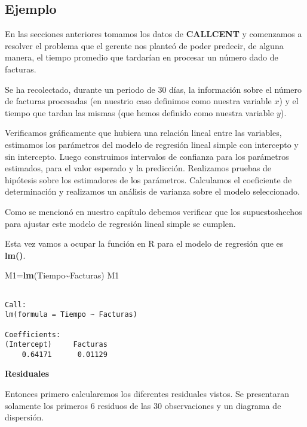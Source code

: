 \documentclass[
  a4paper,
  oneside,
  openany]{book}
\newenvironment{Shaded}{\begin{snugshade}}{\end{snugshade}}
\newcommand{\FunctionTok}[1]{\textcolor[rgb]{0.13,0.29,0.53}{\textbf{#1}}}
\newcommand{\NormalTok}[1]{#1}
\newcommand{\OtherTok}[1]{\textcolor[rgb]{0.56,0.35,0.01}{#1}}
\newcommand{\SpecialCharTok}[1]{\textcolor[rgb]{0.81,0.36,0.00}{\textbf{#1}}}
\begin{document}
\hypertarget{ejemplo-19}{%
\subsection{Ejemplo}\label{ejemplo-19}}

En las secciones anteriores tomamos los datos de \textbf{CALLCENT} y comenzamos a resolver el problema que el gerente nos planteó de poder
predecir, de alguna manera, el tiempo promedio que tardarían en procesar un número dado de facturas.

Se ha recolectado, durante un periodo de 30 días, la información sobre el número de facturas procesadas (en nuestrio caso definimos como nuestra variable \(x\)) y el tiempo que tardan las mismas (que hemos definido como nuestra variable \(y\)).

Verificamos gráficamente que hubiera una relación lineal entre las variables, estimamos los parámetros del modelo de regresión lineal simple con intercepto y sin intercepto. Luego construimos intervalos de confianza para los parámetros estimados, para el valor esperado y la predicción. Realizamos pruebas de hipótesis sobre los estimadores de los parámetros. Calculamos el coeficiente de determinación y realizamos un análisis de varianza sobre el modelo seleccionado.

Como se mencionó en nuestro capítulo debemos verificar que los supuestoshechos para ajustar este modelo de regresión lineal simple se cumplen.

Esta vez vamos a ocupar la función en R para el modelo de regresión que es \textbf{lm()}.

\begin{Shaded}
\begin{Highlighting}[]
\NormalTok{M1}\OtherTok{=}\FunctionTok{lm}\NormalTok{(Tiempo}\SpecialCharTok{\textasciitilde{}}\NormalTok{Facturas)}
\NormalTok{M1}
\end{Highlighting}
\end{Shaded}

\begin{verbatim}

Call:
lm(formula = Tiempo ~ Facturas)

Coefficients:
(Intercept)     Facturas  
    0.64171      0.01129  
\end{verbatim}

\textbf{Residuales}

Entonces primero calcularemos los diferentes residuales vistos. Se presentaran solamente los primeros 6 residuos de las 30 observaciones y un diagrama de dispersión.
\end{document}

